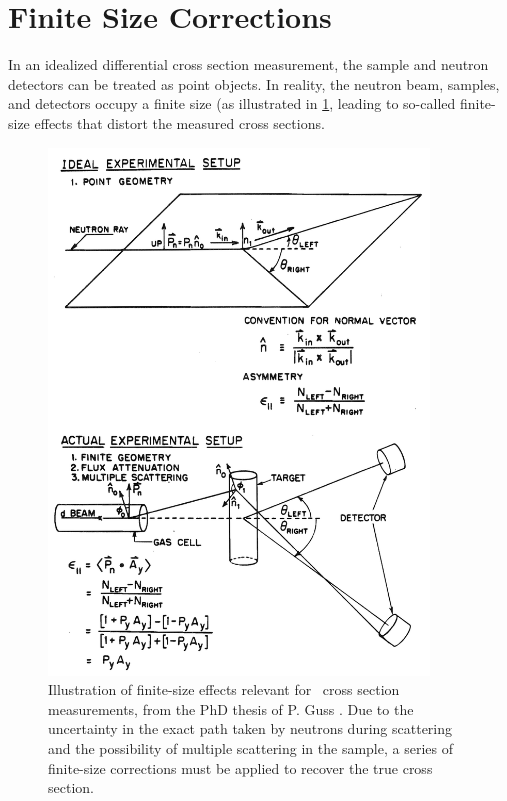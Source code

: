 \section{Finite Size Corrections}
In an idealized differential cross section measurement, the sample and neutron
detectors can be treated as point objects. In reality, the neutron beam,
samples, and detectors occupy a finite size (as illustrated in \ref{GussFiniteSizeDiagram},
leading to so-called finite-size effects that distort the measured cross sections.
\begin{figure}[tb]
    \centering
        \includegraphics[width = 0.9\textwidth]{figures/GussFiniteSizeDiagram.png}
        \caption[Illustration of finite-size effects relevant for \el\ cross
        section measurements]
        {
            Illustration of finite-size effects relevant for \el\ cross
            section measurements, from the PhD thesis of P. Guss
            \cite{GussPhDThesis}. Due to the uncertainty in the exact path taken
            by neutrons during scattering and the possibility of multiple
            scattering in the sample, a series of finite-size corrections
            must be applied to recover the true cross section.
        }
        \label{GussFiniteSizeDiagram}
\end{figure}
